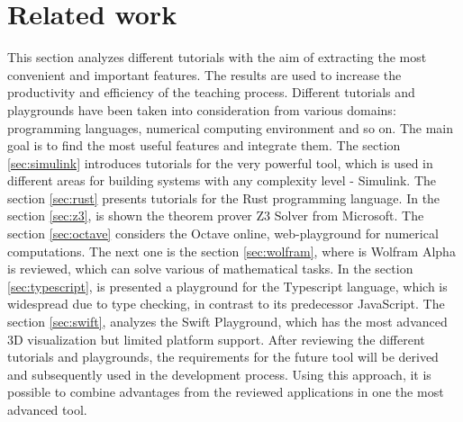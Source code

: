 \chapter{Related work} \label{sec:related}
This section analyzes different tutorials with the aim of extracting the most convenient and important features. The results are used to increase the productivity and efficiency of the teaching process. Different tutorials and playgrounds have been taken into consideration from various domains: programming languages, numerical computing environment and so on. The main goal is to find the most useful features and integrate them.
The section \ref{sec:simulink} introduces tutorials for the very powerful tool, which is used in different areas for building systems with any complexity level - Simulink. The section \ref{sec:rust} presents tutorials for the Rust programming language. In the section \ref{sec:z3}, is shown the theorem prover Z3 Solver from Microsoft. The section \ref{sec:octave} considers the Octave online, web-playground for numerical computations. The next one is the section \ref{sec:wolfram}, where is Wolfram Alpha is reviewed, which can solve various of mathematical tasks. In the section \ref{sec:typescript}, is presented a playground for the Typescript language, which is widespread due to type checking, in contrast to its predecessor JavaScript. The section \ref{sec:swift}, analyzes the Swift Playground, which has the most advanced 3D visualization but limited platform support. After reviewing the different tutorials and playgrounds, the requirements for the future tool will be derived and subsequently used in the development process. Using this approach, it is possible to combine advantages from the reviewed applications in one the most advanced tool.

